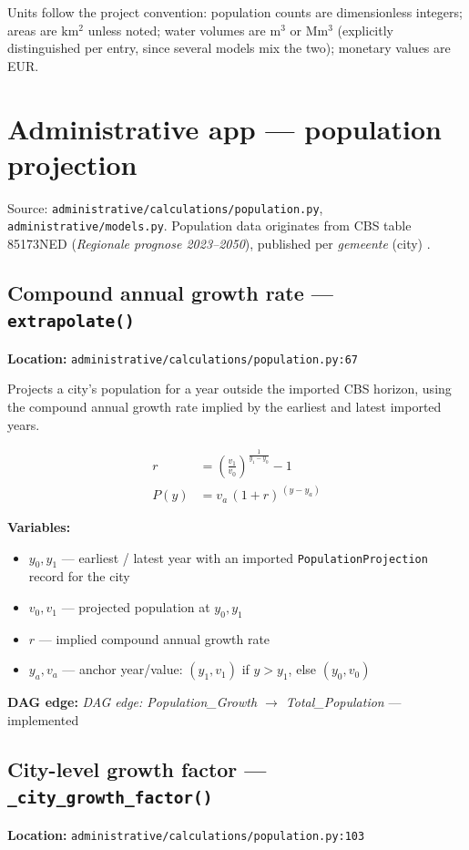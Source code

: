 \documentclass[11pt]{article}
\newcommand{\code}[1]{\texttt{#1}}
\newcommand{\dagedge}[1]{\textit{DAG edge: #1}}
\newcommand{\statusdone}{\textcolor{green!50!black}{implemented}}
\begin{document}
Units follow the project convention: population counts are dimensionless integers; areas are $\mathrm{km^2}$ unless noted; water volumes are $\mathrm{m^3}$ or $\mathrm{Mm^3}$ (explicitly distinguished per entry, since several models mix the two); monetary values are EUR.

\section{Administrative app --- population projection}
\label{sec:administrative}

Source: \code{administrative/calculations/population.py}, \code{administrative/models.py}. Population data originates from CBS table 85173NED (\textit{Regionale prognose 2023--2050}), published per \textit{gemeente} (city) \cite{CBS85173NED}.

\subsection{Compound annual growth rate --- \code{extrapolate()}}
\textbf{Location:} \code{administrative/calculations/population.py:67}

Projects a city's population for a year outside the imported CBS horizon, using the compound annual growth rate implied by the earliest and latest imported years.

\begin{align}
  r &= \left(\frac{v_1}{v_0}\right)^{\frac{1}{y_1 - y_0}} - 1 \\
  P(y) &= v_a \, (1 + r)^{\,(y - y_a)}
\end{align}

\textbf{Variables:}
\begin{itemize}[nosep]
  \item $y_0, y_1$ --- earliest / latest year with an imported \code{PopulationProjection} record for the city
  \item $v_0, v_1$ --- projected population at $y_0, y_1$
  \item $r$ --- implied compound annual growth rate
  \item $y_a, v_a$ --- anchor year/value: $(y_1, v_1)$ if $y > y_1$, else $(y_0, v_0)$
\end{itemize}

\textbf{DAG edge:} \dagedge{Population\_Growth $\rightarrow$ Total\_Population} --- \statusdone{}

\subsection{City-level growth factor --- \code{\_city\_growth\_factor()}}
\textbf{Location:} \code{administrative/calculations/population.py:103}
\end{document}

